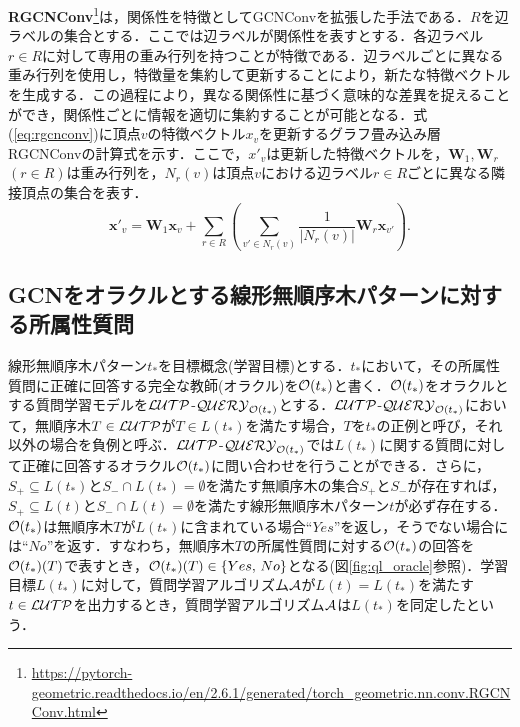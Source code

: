 \textbf{RGCNConv}\footnote{\url{https://pytorch-geometric.readthedocs.io/en/2.6.1/generated/torch_geometric.nn.conv.RGCNConv.html}}\cite{pyg-rgcnconv}は，関係性を特徴としてGCNConvを拡張した手法である．$R$を辺ラベルの集合とする．ここでは辺ラベルが関係性を表すとする．各辺ラベル$r\in R$に対して専用の重み行列を持つことが特徴である．辺ラベルごとに異なる重み行列を使用し，特徴量を集約して更新することにより，新たな特徴ベクトルを生成する．この過程により，異なる関係性に基づく意味的な差異を捉えることができ，関係性ごとに情報を適切に集約することが可能となる．式(\ref{eq:rgcnconv})に頂点$v$の特徴ベクトル$x_v$を更新するグラフ畳み込み層RGCNConvの計算式を示す．ここで，$x'_v$は更新した特徴ベクトルを，$\textbf{W}_1,\textbf{W}_r$~$(r\in R)$は重み行列を，$N_r(v)$は頂点$v$における辺ラベル$r\in R$ごとに異なる隣接頂点の集合を表す．
\begin{equation}
  \label{eq:rgcnconv}
  \bm{x}'_{v}=\textbf{W}_{1}\bm{x}_{v}+\sum_{r\in R}\left(\sum_{v'\in N_{r}(v)}\frac{1}{|N_{r}(v)|}\textbf{W}_{r}\bm{x}_{v'}\right).
\end{equation}

\subsection{GCNをオラクルとする線形無順序木パターンに対する所属性質問}
線形無順序木パターン$t_*$を目標概念(学習目標)とする．$t_*$において，その所属性質問に正確に回答する完全な教師(オラクル)を${\cal O}(t_{\ast})$と書く．${\cal O}(t_*)$をオラクルとする質問学習モデルを${\cal LUTP}$-${\cal QUERY}_{{\cal O}(t_{\ast})}$とする．${\cal LUTP}$-${\cal QUERY}_{{\cal O}(t_{\ast})}$において，無順序木$T\in{\cal LUTP}$が$T\in L(t_{\ast})$を満たす場合，$T$を$t_{\ast}$の正例と呼び，それ以外の場合を負例と呼ぶ．${\cal LUTP}$-${\cal QUERY}_{{\cal O}(t_{\ast})}$では$L(t_*)$に関する質問に対して正確に回答するオラクル${\cal O}(t_{\ast})$に問い合わせを行うことができる．さらに，$S_{+}\subseteq L(t_{\ast})$と$S_{-}\cap L(t_{\ast})=\emptyset$を満たす無順序木の集合$S_+$と$S_-$が存在すれば，$S_{+}\subseteq L(t)$と$S_{-}\cap L(t)=\emptyset$を満たす線形無順序木パターン$t$が必ず存在する．${\cal O}(t_{\ast})$は無順序木$T$が$L(t_{\ast})$に含まれている場合``$Yes$''を返し，そうでない場合には``$No$''を返す．すなわち，無順序木$T$の所属性質問に対する${\cal O}(t_{\ast})$の回答を${\cal O}(t_{\ast})(T)$で表すとき，${\cal O}(t_{\ast})(T)\in\{Yes,\,No\}$となる(図\ref{fig:ql_oracle}参照)．学習目標$L(t_*)$に対して，質問学習アルゴリズム${\cal A}$が$L(t)=L(t_*)$を満たす$t\in {\cal LUTP}$を出力するとき，質問学習アルゴリズム${\cal A}$は$L(t_*)$を同定したという．

